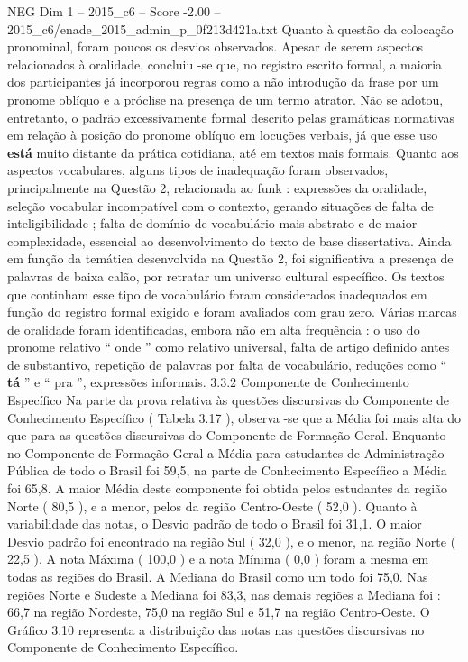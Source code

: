 \begin{textsample}{NEG Dim 1 – 2015\_c6 – Score -2.00 – 2015\_c6/enade\_2015\_admin\_p\_0f213d421a.txt}
Quanto à questão da colocação pronominal, foram poucos os desvios observados.
Apesar de serem aspectos relacionados à oralidade, concluiu -se que, no registro escrito formal, a maioria dos participantes já incorporou regras como a não introdução da frase por um pronome oblíquo e a próclise na presença de um termo atrator.
Não se adotou, entretanto, o padrão excessivamente formal descrito pelas gramáticas normativas em relação à posição do pronome oblíquo em locuções verbais, já que esse uso \textbf{está} muito distante da prática cotidiana, até em textos mais formais.
Quanto aos aspectos vocabulares, alguns tipos de inadequação foram observados, principalmente na Questão 2, relacionada ao funk : expressões da oralidade, seleção vocabular incompatível com o contexto, gerando situações de falta de inteligibilidade ; falta de domínio de vocabulário mais abstrato e de maior complexidade, essencial ao desenvolvimento do texto de base dissertativa.
Ainda em função da temática desenvolvida na Questão 2, foi significativa a presença de palavras de baixa calão, por retratar um universo cultural específico.
Os textos que continham esse tipo de vocabulário foram considerados inadequados em função do registro formal exigido e foram avaliados com grau zero.
Várias marcas de oralidade foram identificadas, embora não em alta frequência : o uso do pronome relativo “ onde ” como relativo universal, falta de artigo definido antes de substantivo, repetição de palavras por falta de vocabulário, reduções como “ \textbf{tá} ” e “ pra ”, expressões informais. 3.3.2 Componente de Conhecimento Específico Na parte da prova relativa às questões discursivas do Componente de Conhecimento Específico ( Tabela 3.17 ), observa -se que a Média foi mais alta do que para as questões discursivas do Componente de Formação Geral.
Enquanto no Componente de Formação Geral a Média para estudantes de Administração Pública de todo o Brasil foi 59,5, na parte de Conhecimento Específico a Média foi 65,8.
A maior Média deste componente foi obtida pelos estudantes da região Norte ( 80,5 ), e a menor, pelos da região Centro-Oeste ( 52,0 ).
Quanto à variabilidade das notas, o Desvio padrão de todo o Brasil foi 31,1.
O maior Desvio padrão foi encontrado na região Sul ( 32,0 ), e o menor, na região Norte ( 22,5 ).
A nota Máxima ( 100,0 ) e a nota Mínima ( 0,0 ) foram a mesma em todas as regiões do Brasil.
A Mediana do Brasil como um todo foi 75,0.
Nas regiões Norte e Sudeste a Mediana foi 83,3, nas demais regiões a Mediana foi : 66,7 na região Nordeste, 75,0 na região Sul e 51,7 na região Centro-Oeste.
O Gráfico 3.10 representa a distribuição das notas nas questões discursivas no Componente de Conhecimento Específico.

\end{textsample}
